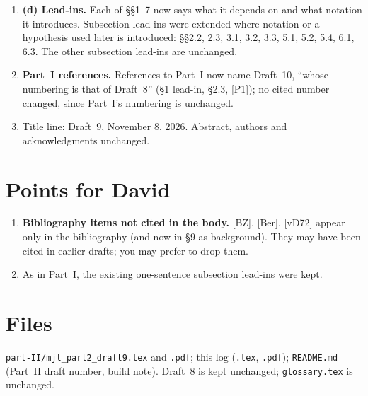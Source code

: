 \documentclass[11pt]{article}
\begin{document}
\begin{enumerate}[leftmargin=*]
\item \textbf{(d) Lead-ins.}  Each of \S\S1--7 now says what it
depends on and what notation it introduces.  Subsection lead-ins were
extended where notation or a hypothesis used later is introduced:
\S\S2.2, 2.3, 3.1, 3.2, 3.3, 5.1, 5.2, 5.4, 6.1, 6.3.  The other
subsection lead-ins are unchanged.

\item \textbf{Part~I references.}  References to Part~I now name
Draft~10, ``whose numbering is that of Draft~8'' (\S1 lead-in,
\S2.3, [P1]); no cited number changed, since Part~I's numbering is
unchanged.

\item Title line: Draft~9, November 8, 2026.  Abstract, authors and
acknowledgments unchanged.
\end{enumerate}

\section*{Points for David}
\begin{enumerate}[leftmargin=*]
\item \textbf{Bibliography items not cited in the body.}  [BZ], [Ber],
[vD72] appear only in the bibliography (and now in \S9 as background).
They may have been cited in earlier drafts; you may prefer to drop
them.
\item As in Part~I, the existing one-sentence subsection lead-ins were
kept.
\end{enumerate}

\section*{Files}
\texttt{part-II/mjl\_part2\_draft9.tex} and \texttt{.pdf}; this log
(\texttt{.tex}, \texttt{.pdf}); \texttt{README.md} (Part~II draft
number, build note).  Draft~8 is kept unchanged; \texttt{glossary.tex}
is unchanged.
\end{document}
